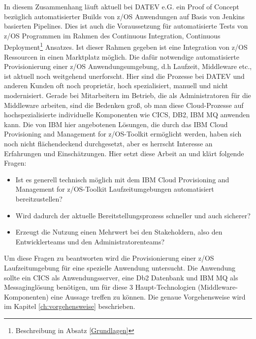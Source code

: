 In diesem Zusammenhang läuft aktuell  bei DATEV e.G. ein Proof of Concept bezüglich automatisierter Builds von z/OS Anwendungen auf Basis von Jenkins basierten Pipelines.
Dies ist auch die Voraussetzung für automatisierte Tests von z/OS Programmen im Rahmen des \glqq Continuous Integration, Continuous Deployment\grqq{}\footnote{Beschreibung in Absatz \ref{Grundlagen}} Ansatzes.
Ist dieser Rahmen gegeben ist eine Integration von z/OS Ressourcen in einen Marktplatz möglich.
Die dafür notwendige automatisierte Provisionierung einer z/OS Anwendungsumgebung, d.h Laufzeit, Middleware etc., ist aktuell noch weitgehend unerforscht. 
Hier sind die Prozesse bei DATEV und anderen Kunden oft noch proprietär, hoch spezialisiert,  manuell und nicht modernisiert. 
Gerade bei Mitarbeitern im Betrieb, die als Administratoren für die Middleware arbeiten, sind die Bedenken groß, ob man diese Cloud-Prozesse auf hochspezialisierte individuelle Komponenten wie CICS, DB2, IBM MQ anwenden kann.
Die von IBM hier angebotenen Lösungen, die durch das \glqq IBM Cloud Provisioning and Management for z/OS\grqq-Toolkit ermöglicht werden, haben sich noch nicht flächendeckend durchgesetzt, aber es herrscht Interesse an Erfahrungen und Einschätzungen.
Hier setzt diese Arbeit an und klärt folgende Fragen:

\begin{samepage}
\begin{itemize}
\item Ist es generell technisch möglich mit dem \glqq IBM Cloud Provisioning and Management for z/OS\grqq-Toolkit Laufzeitumgebungen automatisiert bereitzustellen?
\item Wird dadurch der aktuelle Bereitstellungsprozess schneller und auch sicherer?
\item Erzeugt die Nutzung einen Mehrwert bei den Stakeholdern, also den Entwicklerteams und den Administratorenteams?
\end{itemize}
\end{samepage}

Um diese Fragen zu beantworten wird die Provisionierung einer z/OS Laufzeitumgebung für eine spezielle Anwendung untersucht.
Die Anwendung sollte ein CICS als Anwendungsserver, eine Db2 Datenbank und IBM MQ als Messaginglösung benötigen, um für diese 3 Haupt-Technologien (Middleware-Komponenten) eine Aussage treffen zu können.
Die genaue Vorgehensweise wird im Kapitel \ref{ch:vorgehensweise} beschrieben.
